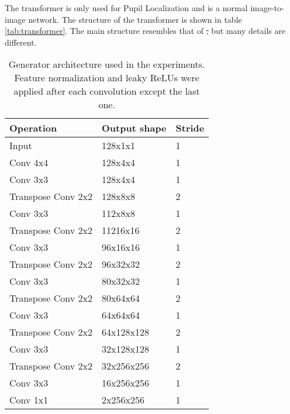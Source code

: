 The transformer is only used for Pupil Localization and is a normal image-to-image network. The structure of the transformer is shown in table \ref{tab:transformer}. The main structure resembles that of \textcite{ronneberger2015u}\st{,} but many details are different.


\begin{table}[t]
    \centering
    \caption{Generator architecture used in the experiments. Feature normalization and leaky ReLUs were applied after each convolution except the last one.}
    \label{tab:generator}
    \begin{tabular}{|lll|}
        \hline
        Operation          & Output shape     & Stride \\ \hline
        Input              & 128x1x1   & 1      \\
        Conv 4x4           & 128x4x4   & 1      \\
        Conv 3x3           & 128x4x4   & 1      \\ \hline
        Transpose Conv 2x2 & 128x8x8   & 2      \\
        Conv 3x3           & 112x8x8   & 1      \\ \hline
        Transpose Conv 2x2 & 11216x16   & 2      \\
        Conv 3x3           & 96x16x16   & 1      \\ \hline
        Transpose Conv 2x2 & 96x32x32   & 2      \\
        Conv 3x3           & 80x32x32   & 1      \\ \hline
        Transpose Conv 2x2 & 80x64x64   & 2      \\
        Conv 3x3           & 64x64x64   & 1      \\ \hline
        Transpose Conv 2x2 & 64x128x128   & 2      \\
        Conv 3x3           & 32x128x128   & 1      \\ \hline
        Transpose Conv 2x2 & 32x256x256   & 2      \\
        Conv 3x3           & 16x256x256   & 1      \\ \hline
        Conv 1x1           & 2x256x256 & 1        \\ \hline
    \end{tabular}
\end{table}

